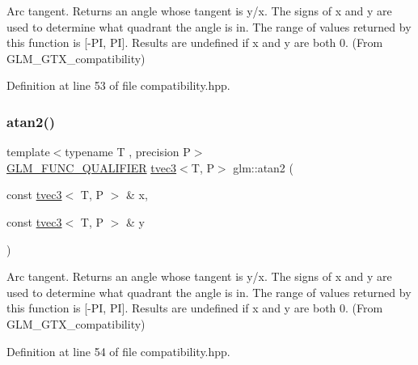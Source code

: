 Arc tangent. Returns an angle whose tangent is y/x. The signs of x and y are used to determine what quadrant the angle is in. The range of values returned by this function is \mbox{[}-\/PI, PI\mbox{]}. Results are undefined if x and y are both 0. (From G\+L\+M\+\_\+\+G\+T\+X\+\_\+compatibility) 



Definition at line 53 of file compatibility.\+hpp.

\mbox{\label{group__gtx__compatibility_gad328042b6734d3f2c49c0ec1328b14c0}} 
\subsubsection{\texorpdfstring{atan2()}{atan2()}\hspace{0.1cm}{\footnotesize\ttfamily [3/4]}}
{\footnotesize\ttfamily template$<$typename T , precision P$>$ \\
\mbox{\hyperlink{setup_8hpp_a33fdea6f91c5f834105f7415e2a64407}{G\+L\+M\+\_\+\+F\+U\+N\+C\+\_\+\+Q\+U\+A\+L\+I\+F\+I\+ER}} \mbox{\hyperlink{structglm_1_1tvec3}{tvec3}}$<$T, P$>$ glm\+::atan2 (\begin{DoxyParamCaption}\item[{const \mbox{\hyperlink{structglm_1_1tvec3}{tvec3}}$<$ T, P $>$ \&}]{x,  }\item[{const \mbox{\hyperlink{structglm_1_1tvec3}{tvec3}}$<$ T, P $>$ \&}]{y }\end{DoxyParamCaption})}



Arc tangent. Returns an angle whose tangent is y/x. The signs of x and y are used to determine what quadrant the angle is in. The range of values returned by this function is \mbox{[}-\/PI, PI\mbox{]}. Results are undefined if x and y are both 0. (From G\+L\+M\+\_\+\+G\+T\+X\+\_\+compatibility) 



Definition at line 54 of file compatibility.\+hpp.

\mbox{\label{group__gtx__compatibility_ga09d39c391a509a045b6c7061f15bdff5}} 
